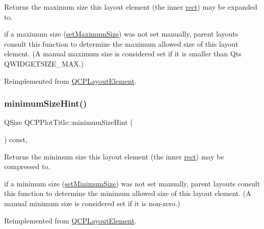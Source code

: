 Returns the maximum size this layout element (the inner \hyperlink{class_q_c_p_layout_element_a208effccfe2cca4a0eaf9393e60f2dd4}{rect}) may be expanded to.

if a maximum size (\hyperlink{class_q_c_p_layout_element_a74eb5280a737ab44833d506db65efd95}{set\+Maximum\+Size}) was not set manually, parent layouts consult this function to determine the maximum allowed size of this layout element. (A manual maximum size is considered set if it is smaller than Qt\textquotesingle{}s Q\+W\+I\+D\+G\+E\+T\+S\+I\+Z\+E\+\_\+\+M\+AX.) 

Reimplemented from \hyperlink{class_q_c_p_layout_element_ab5ce2ba22b36d9a3b70a1be562c326e5}{Q\+C\+P\+Layout\+Element}.

\hypertarget{class_q_c_p_plot_title_aeed5454134516655723bf2d0499dea24}{}\label{class_q_c_p_plot_title_aeed5454134516655723bf2d0499dea24} 
\subsubsection{\texorpdfstring{minimum\+Size\+Hint()}{minimumSizeHint()}}
{\footnotesize\ttfamily Q\+Size Q\+C\+P\+Plot\+Title\+::minimum\+Size\+Hint (\begin{DoxyParamCaption}{ }\end{DoxyParamCaption}) const\hspace{0.3cm}{\ttfamily [protected]}, {\ttfamily [virtual]}}

Returns the minimum size this layout element (the inner \hyperlink{class_q_c_p_layout_element_a208effccfe2cca4a0eaf9393e60f2dd4}{rect}) may be compressed to.

if a minimum size (\hyperlink{class_q_c_p_layout_element_a5dd29a3c8bc88440c97c06b67be7886b}{set\+Minimum\+Size}) was not set manually, parent layouts consult this function to determine the minimum allowed size of this layout element. (A manual minimum size is considered set if it is non-\/zero.) 

Reimplemented from \hyperlink{class_q_c_p_layout_element_ab3fdb5c9a5189bb2dac10d4d25329cd8}{Q\+C\+P\+Layout\+Element}.

\hypertarget{class_q_c_p_plot_title_a3a01ede2da3b0b5eda33aa5274cc3523}{}\label{class_q_c_p_plot_title_a3a01ede2da3b0b5eda33aa5274cc3523} 
